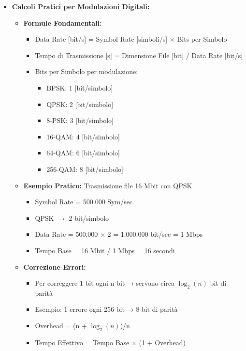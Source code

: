 \begin{itemize}
    \item \textbf{Calcoli Pratici per Modulazioni Digitali:}
    \begin{itemize}
        \item \textbf{Formule Fondamentali:}
        \begin{itemize}
            \item Data Rate [\si{bit/s}] = Symbol Rate [\si{simboli/s}] $\times$ Bits per Simbolo
            \item Tempo di Trasmissione [\si{s}] = Dimensione File [\si{bit}] / Data Rate [\si{bit/s}]
            \item Bits per Simbolo per modulazione:
                \begin{itemize}
                    \item BPSK: 1 [\si{bit/simbolo}]
                    \item QPSK: 2 [\si{bit/simbolo}]
                    \item 8-PSK: 3 [\si{bit/simbolo}]
                    \item 16-QAM: 4 [\si{bit/simbolo}]
                    \item 64-QAM: 6 [\si{bit/simbolo}]
                    \item 256-QAM: 8 [\si{bit/simbolo}]
                \end{itemize}
        \end{itemize}
        
        \item \textbf{Esempio Pratico:} Trasmissione file 16 Mbit con QPSK
        \begin{itemize}
            \item Symbol Rate = 500.000 Sym/sec
            \item QPSK $\rightarrow$ 2 bit/simbolo
            \item Data Rate = 500.000 $\times$ 2 = 1.000.000 bit/sec = 1 Mbps
            \item Tempo Base = 16 Mbit / 1 Mbps = 16 secondi
        \end{itemize}
        
        \item \textbf{Correzione Errori:}
        \begin{itemize}
            \item Per correggere 1 bit ogni n bit → servono circa $\log_2(n)$ bit di parità
            \item Esempio: 1 errore ogni 256 bit → 8 bit di parità
            \item Overhead = (n + $\log_2(n)$)/n
            \item Tempo Effettivo = Tempo Base $\times$ (1 + Overhead)
        \end{itemize}
    \end{itemize}


\end{itemize}
